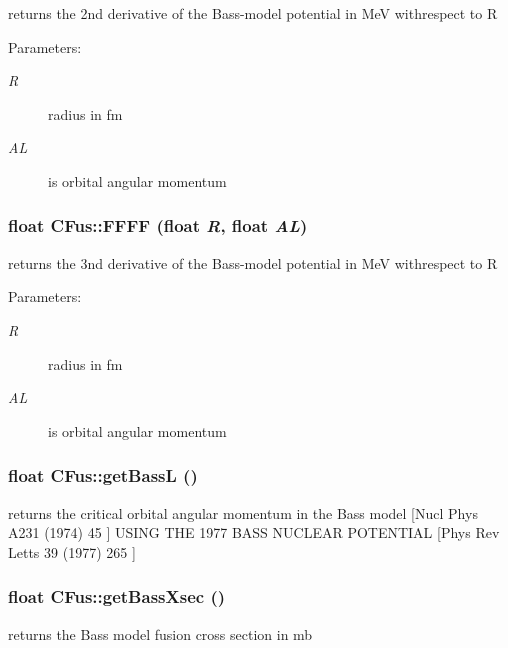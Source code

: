 returns the 2nd derivative of the Bass-model potential in Me\-V withrespect to R \begin{Desc}
\item[Parameters:]
\begin{description}
\item[{\em R}]radius in fm \item[{\em AL}]is orbital angular momentum \end{description}
\end{Desc}
\subsubsection{\setlength{\rightskip}{0pt plus 5cm}float CFus::FFFF (float {\em R}, float {\em AL})\hspace{0.3cm}{\tt  [protected]}}\label{classCFus_9091a330d6bfa82f79bfb5d8cd673290}


returns the 3nd derivative of the Bass-model potential in Me\-V withrespect to R \begin{Desc}
\item[Parameters:]
\begin{description}
\item[{\em R}]radius in fm \item[{\em AL}]is orbital angular momentum \end{description}
\end{Desc}
\subsubsection{\setlength{\rightskip}{0pt plus 5cm}float CFus::get\-Bass\-L ()}\label{classCFus_278888ee021596a70ff4e10375b7adfe}


returns the critical orbital angular momentum in the Bass model [Nucl Phys A231 (1974) 45 ] USING THE 1977 BASS NUCLEAR POTENTIAL [Phys Rev Letts 39 (1977) 265 ] 
\subsubsection{\setlength{\rightskip}{0pt plus 5cm}float CFus::get\-Bass\-Xsec ()}\label{classCFus_35f204c7a834c9fe6df3c6efad02956f}


returns the Bass model fusion cross section in mb 
